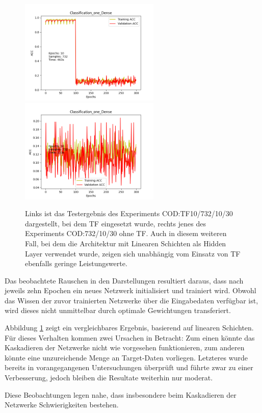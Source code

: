 \begin{figure}[htpb]
    \includegraphics[height=5cm]{../../Plots/ba_plots/classTF/cod_tr.png}
    \includegraphics[height=5cm]{../../Plots/ba_plots/classTF/wocod_tr.png}
    \caption{\label{fig:cod_tr} 
    \small{Links ist das Testergebnis des Experiments COD:TF10/732/10/30 dargestellt, bei dem TF eingesetzt wurde, rechts jenes des 
    Experiments COD:732/10/30 ohne TF. Auch in diesem weiteren Fall, bei dem die Architektur mit Linearen Schichten als Hidden Layer verwendet 
    wurde, zeigen sich unabhängig vom Einsatz von TF ebenfalls geringe Leistungswerte.}}
\end{figure}

Das beobachtete Rauschen in den Darstellungen resultiert daraus, dass nach jeweils zehn Epochen ein neues Netzwerk initialisiert und trainiert 
wird. Obwohl das Wissen der zuvor trainierten Netzwerke über die Eingabedaten verfügbar ist, wird dieses nicht unmittelbar durch optimale 
Gewichtungen transferiert.

Abbildung \ref{fig:cod_tr} zeigt ein vergleichbares Ergebnis, basierend auf linearen Schichten. Für dieses Verhalten kommen zwei Ursachen in 
Betracht: Zum einen könnte das Kaskadieren der Netzwerke nicht wie vorgesehen funktionieren, zum anderen könnte eine unzureichende Menge an 
Target-Daten vorliegen. Letzteres wurde bereits in vorangegangenen Untersuchungen überprüft und führte zwar zu einer Verbesserung, jedoch 
bleiben die Resultate weiterhin nur moderat.

Diese Beobachtungen legen nahe, dass insbesondere beim Kaskadieren der Netzwerke Schwierigkeiten bestehen.
